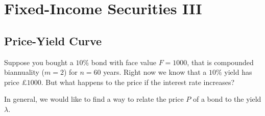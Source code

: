 
\chapter{Fixed-Income Securities III}




\section{Price-Yield Curve}

Suppose you bought a $10\%$ bond with face value $F = 1000$,
that is compounded biannuality ($m = 2$) for $n = 60$ years. 
Right now we know that a $10\%$ yield has price $\pounds 1000$. 
But what happens to the price if the interest rate increases?


In general, we would like to find a way to relate the price $P$
of a bond to the yield $\lambda$. 




